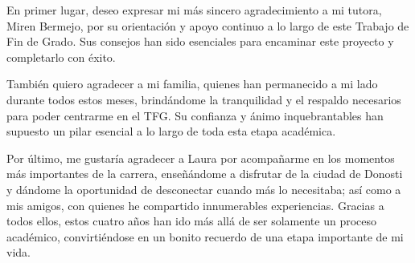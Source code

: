 En primer lugar, deseo expresar mi más sincero agradecimiento a mi tutora, Miren Bermejo, por su orientación y apoyo continuo a lo largo de este Trabajo de Fin de Grado. Sus consejos han sido esenciales para encaminar este proyecto y completarlo con éxito.

También quiero agradecer a mi familia, quienes han permanecido a mi lado durante todos estos meses, brindándome la tranquilidad y el respaldo necesarios para poder centrarme en el TFG. Su confianza y ánimo inquebrantables han supuesto un pilar esencial a lo largo de toda esta etapa académica.

Por último, me gustaría agradecer a Laura por acompañarme en los momentos más importantes de la carrera, enseñándome a disfrutar de la ciudad de Donosti y dándome la oportunidad de desconectar cuando más lo necesitaba; así como a mis amigos, con quienes he compartido innumerables experiencias. Gracias a todos ellos, estos cuatro años han ido más allá de ser solamente un proceso académico, convirtiéndose en un bonito recuerdo de una etapa importante de mi vida.

